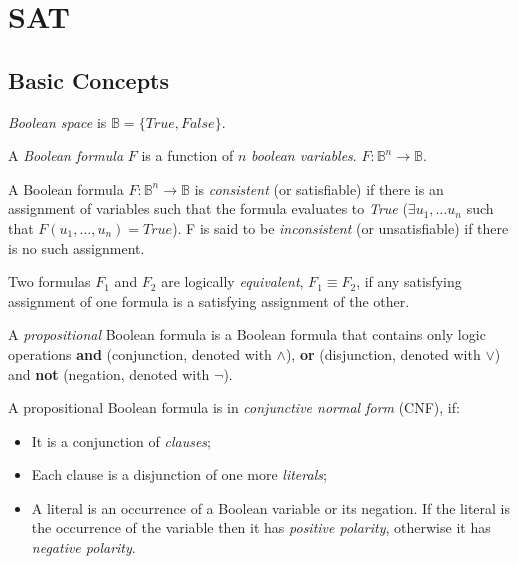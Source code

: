\chapter{SAT}

\section{Basic Concepts}

\begin{mydef}
  \emph{Boolean space} is $\mathbb{B} = \{ True, False \}$.
\end{mydef}

\begin{mydef}
  A \emph{Boolean formula} $F$ is a function of $n$ \emph{boolean variables}.
  $F : \mathbb{B}^n \rightarrow \mathbb{B}$.
\end{mydef}

\begin{mydef}
  A Boolean formula $F : \mathbb{B}^n \rightarrow \mathbb{B}$ is
  \emph{consistent} (or satisfiable) if there is an assignment of
  variables such that the formula evaluates to \emph{True}
  ($\exists u_1, \ldots u_n$ such that $F(u_1, \ldots, u_n) = True$).
  F is said to be \emph{inconsistent} (or unsatisfiable) if
  there is no such assignment.
\end{mydef}

\begin{mydef}
  Two formulas $F_1$ and $F_2$ are logically \emph{equivalent},
  $F_1 \equiv F_2$, if any satisfying assignment of one formula is
  a satisfying assignment of the other.
\end{mydef}

\begin{mydef}
  A \emph{propositional} Boolean formula is a Boolean formula that contains only
  logic operations \textbf{and} (conjunction, denoted with $\land$),
  \textbf{or} (disjunction, denoted with $\lor$) and \textbf{not}
  (negation, denoted with $\neg$).
\end{mydef}

A propositional Boolean formula is in \emph{conjunctive normal form}
(CNF), if:
\begin{itemize}
  \item It is a conjunction of \emph{clauses};
  \item Each clause is a disjunction of one more \emph{literals};
  \item A literal is an occurrence of a Boolean variable or its negation.
  If the literal is the occurrence of the variable
  then it has \emph{positive polarity}, otherwise it has \emph{negative
  polarity}.
\end{itemize}

